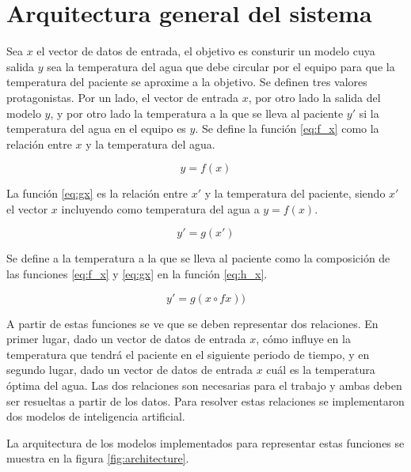 \section{Arquitectura general del sistema}
 Sea $x$ el vector de datos de entrada, el objetivo es consturir un modelo cuya salida $y$ sea la temperatura del agua que debe circular por el equipo para que la temperatura del paciente se aproxime a la objetivo. Se definen tres valores protagonistas. Por un lado, el vector de entrada $x$, por otro lado la salida del modelo $y$, y por otro lado la temperatura a la que se lleva al paciente $y'$ si la temperatura del agua en el equipo es $y$.
Se define la función \ref{eq:f_x} como la relación entre $x$ y la temperatura del agua.

\begin{equation}
	\label{eq:f_x}
	y = f(x)
\end{equation}

La función \ref{eq:gx} es la relación entre $x'$ y la temperatura del paciente, siendo $x'$ el vector $x$ incluyendo como temperatura del agua a $y = f(x)$.

\begin{equation}
	\label{eq:gx}
	y' = g(x')
\end{equation}

Se define a la temperatura a la que se lleva al paciente como la composición de las funciones \ref{eq:f_x} y \ref{eq:gx} en la función \ref{eq:h_x}.

\begin{equation}
	\label{eq:h_x}
	y' = g(x \circ fx))
\end{equation}

A partir de estas funciones se ve que se deben representar dos relaciones. En primer lugar, dado un vector de datos de entrada $x$, cómo influye en la temperatura que tendrá el paciente en el siguiente periodo de tiempo, y en segundo lugar, dado un vector de datos de entrada $x$ cuál es la temperatura óptima del agua. Las dos relaciones son necesarias para el trabajo y ambas deben ser resueltas a partir de los datos. Para resolver estas relaciones se implementaron dos modelos de inteligencia artificial.

La arquitectura de los modelos implementados para representar estas funciones se muestra en la figura \ref{fig:architecture}. 

\vspace{1cm}

